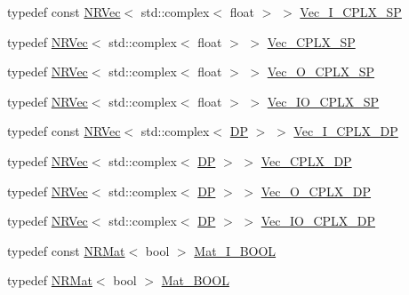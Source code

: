 \begin{DoxyCompactItemize}
\item 
typedef const \mbox{\hyperlink{classNR_1_1NRVec}{N\+R\+Vec}}$<$ std\+::complex$<$ float $>$ $>$ \mbox{\hyperlink{namespaceNR_a34f5160508711dfeeabf170c44c6d813}{Vec\+\_\+\+I\+\_\+\+C\+P\+L\+X\+\_\+\+SP}}
\item 
typedef \mbox{\hyperlink{classNR_1_1NRVec}{N\+R\+Vec}}$<$ std\+::complex$<$ float $>$ $>$ \mbox{\hyperlink{namespaceNR_a3bb807d9aeb8d5c1d651fbc7ceb3a45b}{Vec\+\_\+\+C\+P\+L\+X\+\_\+\+SP}}
\item 
typedef \mbox{\hyperlink{classNR_1_1NRVec}{N\+R\+Vec}}$<$ std\+::complex$<$ float $>$ $>$ \mbox{\hyperlink{namespaceNR_a48e7d2833db243f92c964077383c261f}{Vec\+\_\+\+O\+\_\+\+C\+P\+L\+X\+\_\+\+SP}}
\item 
typedef \mbox{\hyperlink{classNR_1_1NRVec}{N\+R\+Vec}}$<$ std\+::complex$<$ float $>$ $>$ \mbox{\hyperlink{namespaceNR_ae2d1431f9f152dfdbf891d3d131cf309}{Vec\+\_\+\+I\+O\+\_\+\+C\+P\+L\+X\+\_\+\+SP}}
\item 
typedef const \mbox{\hyperlink{classNR_1_1NRVec}{N\+R\+Vec}}$<$ std\+::complex$<$ \mbox{\hyperlink{namespaceNR_af6ff762dd605ff477b8e52387253a02a}{DP}} $>$ $>$ \mbox{\hyperlink{namespaceNR_ad1b14bf0517c78cb2e0c1407b08ba92b}{Vec\+\_\+\+I\+\_\+\+C\+P\+L\+X\+\_\+\+DP}}
\item 
typedef \mbox{\hyperlink{classNR_1_1NRVec}{N\+R\+Vec}}$<$ std\+::complex$<$ \mbox{\hyperlink{namespaceNR_af6ff762dd605ff477b8e52387253a02a}{DP}} $>$ $>$ \mbox{\hyperlink{namespaceNR_a536dbe7aa725634b172a6c366a0a3e4f}{Vec\+\_\+\+C\+P\+L\+X\+\_\+\+DP}}
\item 
typedef \mbox{\hyperlink{classNR_1_1NRVec}{N\+R\+Vec}}$<$ std\+::complex$<$ \mbox{\hyperlink{namespaceNR_af6ff762dd605ff477b8e52387253a02a}{DP}} $>$ $>$ \mbox{\hyperlink{namespaceNR_ace78d6fd6a189eda11ef1f1ec73692d9}{Vec\+\_\+\+O\+\_\+\+C\+P\+L\+X\+\_\+\+DP}}
\item 
typedef \mbox{\hyperlink{classNR_1_1NRVec}{N\+R\+Vec}}$<$ std\+::complex$<$ \mbox{\hyperlink{namespaceNR_af6ff762dd605ff477b8e52387253a02a}{DP}} $>$ $>$ \mbox{\hyperlink{namespaceNR_a5f15a34fe35c8311d00b61d4483a203e}{Vec\+\_\+\+I\+O\+\_\+\+C\+P\+L\+X\+\_\+\+DP}}
\item 
typedef const \mbox{\hyperlink{classNR_1_1NRMat}{N\+R\+Mat}}$<$ bool $>$ \mbox{\hyperlink{namespaceNR_a466d5c0bd034b0d6de59d8933b425b09}{Mat\+\_\+\+I\+\_\+\+B\+O\+OL}}
\item 
typedef \mbox{\hyperlink{classNR_1_1NRMat}{N\+R\+Mat}}$<$ bool $>$ \mbox{\hyperlink{namespaceNR_a59411c0161320f28563d72f97b88ad69}{Mat\+\_\+\+B\+O\+OL}}

\end{DoxyCompactItemize}
